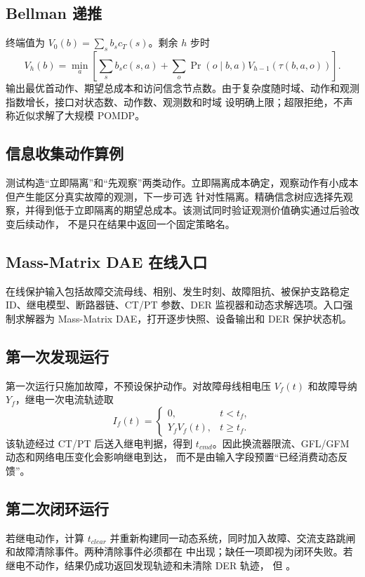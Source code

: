 \subsection{Bellman 递推}
终端值为 $V_0(b)=\sum_sb_sc_T(s)$。剩余 $h$ 步时
\begin{equation}
 V_h(b)=\min_a\left[\sum_sb_sc(s,a)+
 \sum_o\Pr(o\mid b,a)V_{h-1}(\tau(b,a,o))\right].
\end{equation}
输出最优首动作、期望总成本和访问信念节点数。由于复杂度随时域、动作和观测指数增长，接口对状态数、动作数、观测数和时域
设明确上限；超限拒绝，不声称近似求解了大规模 POMDP。

\subsection{信息收集动作算例}
测试构造“立即隔离”和“先观察”两类动作。立即隔离成本确定，观察动作有小成本但产生能区分真实故障的观测，下一步可选
针对性隔离。精确信念树应选择先观察，并得到低于立即隔离的期望总成本。该测试同时验证观测价值确实通过后验改变后续动作，
不是只在结果中返回一个固定策略名。

\subsection{Mass-Matrix DAE 在线入口}
在线保护输入包括故障交流母线、相别、发生时刻、故障阻抗、被保护支路稳定 ID、继电模型、断路器链、CT/PT 参数、DER
监视器和动态求解选项。入口强制求解器为 Mass-Matrix DAE，打开逐步快照、设备输出和 DER 保护状态机。

\subsection{第一次发现运行}
第一次运行只施加故障，不预设保护动作。对故障母线相电压 $V_f(t)$ 和故障导纳 $Y_f$，继电一次电流轨迹取
\begin{equation}
 I_f(t)=\begin{cases}0,&t<t_f,\\Y_fV_f(t),&t\ge t_f.\end{cases}
\end{equation}
该轨迹经过 CT/PT 后送入继电判据，得到 $t_{cmd}$。因此换流器限流、GFL/GFM 动态和网络电压变化会影响继电到达，
而不是由输入字段预置“已经消费动态反馈”。

\subsection{第二次闭环运行}
若继电动作，计算 $t_{clear}$ 并重新构建同一动态系统，同时加入故障、交流支路跳闸和故障清除事件。两种清除事件必须都在
 中出现；缺任一项即视为闭环失败。若继电不动作，结果仍成功返回发现轨迹和未清除 DER 轨迹，
但 。

